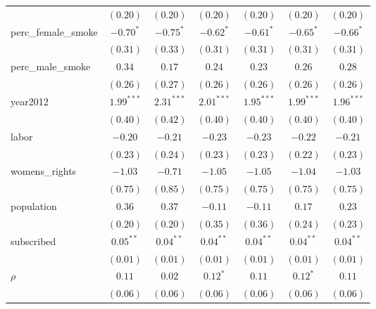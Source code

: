 \begin{table}[!h]
\begin{center}
\begin{tabular}{l c c c c c c }
                        & $(0.20)$     & $(0.20)$     & $(0.20)$     & $(0.20)$     & $(0.20)$     & $(0.20)$     \\
perc\_female\_smoke     & $-0.70^{*}$  & $-0.75^{*}$  & $-0.62^{*}$  & $-0.61^{*}$  & $-0.65^{*}$  & $-0.66^{*}$  \\
                        & $(0.31)$     & $(0.33)$     & $(0.31)$     & $(0.31)$     & $(0.31)$     & $(0.31)$     \\
perc\_male\_smoke       & $0.34$       & $0.17$       & $0.24$       & $0.23$       & $0.26$       & $0.28$       \\
                        & $(0.26)$     & $(0.27)$     & $(0.26)$     & $(0.26)$     & $(0.26)$     & $(0.26)$     \\
year2012                & $1.99^{***}$ & $2.31^{***}$ & $2.01^{***}$ & $1.95^{***}$ & $1.99^{***}$ & $1.96^{***}$ \\
                        & $(0.40)$     & $(0.42)$     & $(0.40)$     & $(0.40)$     & $(0.40)$     & $(0.40)$     \\
labor                   & $-0.20$      & $-0.21$      & $-0.23$      & $-0.23$      & $-0.22$      & $-0.21$      \\
                        & $(0.23)$     & $(0.24)$     & $(0.23)$     & $(0.23)$     & $(0.22)$     & $(0.23)$     \\
womens\_rights          & $-1.03$      & $-0.71$      & $-1.05$      & $-1.05$      & $-1.04$      & $-1.03$      \\
                        & $(0.75)$     & $(0.85)$     & $(0.75)$     & $(0.75)$     & $(0.75)$     & $(0.75)$     \\
population              & $0.36$       & $0.37$       & $-0.11$      & $-0.11$      & $0.17$       & $0.23$       \\
                        & $(0.20)$     & $(0.20)$     & $(0.35)$     & $(0.36)$     & $(0.24)$     & $(0.23)$     \\
subscribed              & $0.05^{**}$  & $0.04^{**}$  & $0.04^{**}$  & $0.04^{**}$  & $0.04^{**}$  & $0.04^{**}$  \\
                        & $(0.01)$     & $(0.01)$     & $(0.01)$     & $(0.01)$     & $(0.01)$     & $(0.01)$     \\
$\rho$                  & $0.11$       & $0.02$       & $0.12^{*}$   & $0.11$       & $0.12^{*}$   & $0.11$       \\
                        & $(0.06)$     & $(0.06)$     & $(0.06)$     & $(0.06)$     & $(0.06)$     & $(0.06)$     \\

\end{tabular}
\end{center}
\end{table}
